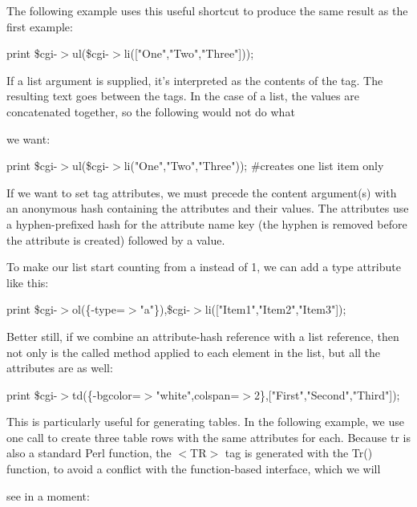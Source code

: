 \documentclass[a4paper,11pt]{book}
\begin{document}
\noindent 

\noindent The following example uses this useful shortcut to produce the same result as the first example:

\noindent 

\noindent print \$cgi-$>$ul(\$cgi-$>$li(["One","Two","Three"]));

\noindent 

\noindent If a list argument is supplied, it's interpreted as the contents of the tag. The resulting text goes between the tags. In the case of a list, the values are concatenated together, so the following would not do what

\noindent we want:

\noindent 

\noindent print \$cgi-$>$ul(\$cgi-$>$li("One","Two","Three")); \#creates one list item only

\noindent 

\noindent If we want to set tag attributes, we must precede the content argument(s) with an anonymous hash containing the attributes and their values. The attributes use a hyphen-prefixed hash for the attribute name key (the hyphen is removed before the attribute is created) followed by a value.

\noindent 

\noindent To make our list start counting from a instead of 1, we can add a type attribute like this:

\noindent 

\noindent print \$cgi-$>$ol(\{-type=$>$"a"\}),\$cgi-$>$li(["Item1","Item2","Item3"]);

\noindent 

\noindent Better still, if we combine an attribute-hash reference with a list reference, then not only is the called method applied to each element in the list, but all the attributes are as well:

\noindent 

\noindent print \$cgi-$>$td(\{-bgcolor=$>$"white",colspan=$>$2\},["First","Second","Third"]);

\noindent 

\noindent This is particularly useful for generating tables. In the following example, we use one call to create three table rows with the same attributes for each. Because tr is also a standard Perl function, the $<$TR$>$ tag is generated with the Tr() function, to avoid a conflict with the function-based interface, which we will

\noindent see in a moment:
\end{document}
